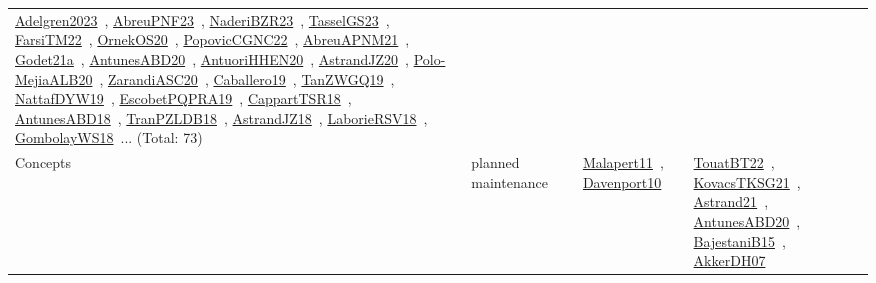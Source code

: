 {\begin{longtable}{lp{3cm}>{\raggedright\arraybackslash}p{6cm}>{\raggedright\arraybackslash}p{6cm}>{\raggedright\arraybackslash}p{8cm}}
\href{../works/Adelgren2023.pdf}{Adelgren2023}~\cite{Adelgren2023}, \href{../works/AbreuPNF23.pdf}{AbreuPNF23}~\cite{AbreuPNF23}, \href{../works/NaderiBZR23.pdf}{NaderiBZR23}~\cite{NaderiBZR23}, \href{../works/TasselGS23.pdf}{TasselGS23}~\cite{TasselGS23}, \href{../works/FarsiTM22.pdf}{FarsiTM22}~\cite{FarsiTM22}, \href{../works/OrnekOS20.pdf}{OrnekOS20}~\cite{OrnekOS20}, \href{../works/PopovicCGNC22.pdf}{PopovicCGNC22}~\cite{PopovicCGNC22}, \href{../works/AbreuAPNM21.pdf}{AbreuAPNM21}~\cite{AbreuAPNM21}, \href{../works/Godet21a.pdf}{Godet21a}~\cite{Godet21a}, \href{../works/AntunesABD20.pdf}{AntunesABD20}~\cite{AntunesABD20}, \href{../works/AntuoriHHEN20.pdf}{AntuoriHHEN20}~\cite{AntuoriHHEN20}, \href{../works/AstrandJZ20.pdf}{AstrandJZ20}~\cite{AstrandJZ20}, \href{../works/Polo-MejiaALB20.pdf}{Polo-MejiaALB20}~\cite{Polo-MejiaALB20}, \href{../works/ZarandiASC20.pdf}{ZarandiASC20}~\cite{ZarandiASC20}, \href{../works/Caballero19.pdf}{Caballero19}~\cite{Caballero19}, \href{../works/TanZWGQ19.pdf}{TanZWGQ19}~\cite{TanZWGQ19}, \href{../works/NattafDYW19.pdf}{NattafDYW19}~\cite{NattafDYW19}, \href{../works/EscobetPQPRA19.pdf}{EscobetPQPRA19}~\cite{EscobetPQPRA19}, \href{../works/CappartTSR18.pdf}{CappartTSR18}~\cite{CappartTSR18}, \href{../works/AntunesABD18.pdf}{AntunesABD18}~\cite{AntunesABD18}, \href{../works/TranPZLDB18.pdf}{TranPZLDB18}~\cite{TranPZLDB18}, \href{../works/AstrandJZ18.pdf}{AstrandJZ18}~\cite{AstrandJZ18}, \href{../works/LaborieRSV18.pdf}{LaborieRSV18}~\cite{LaborieRSV18}, \href{../works/GombolayWS18.pdf}{GombolayWS18}~\cite{GombolayWS18}... (Total: 73)\\
Concepts & planned maintenance &  & \href{../works/Malapert11.pdf}{Malapert11}~\cite{Malapert11}, \href{../works/Davenport10.pdf}{Davenport10}~\cite{Davenport10} & \href{../works/TouatBT22.pdf}{TouatBT22}~\cite{TouatBT22}, \href{../works/KovacsTKSG21.pdf}{KovacsTKSG21}~\cite{KovacsTKSG21}, \href{../works/Astrand21.pdf}{Astrand21}~\cite{Astrand21}, \href{../works/AntunesABD20.pdf}{AntunesABD20}~\cite{AntunesABD20}, \href{../works/BajestaniB15.pdf}{BajestaniB15}~\cite{BajestaniB15}, \href{../works/AkkerDH07.pdf}{AkkerDH07}~\cite{AkkerDH07}\\

\end{longtable}}
